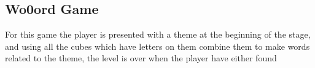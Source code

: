 	

\subsection{Wo0ord Game}
\label{game:wo0ord_game}
For this game the player is presented with a theme at the beginning of the stage, and using all the cubes which have letters on them combine them to make words related to the theme, the level is over when the player have either found 